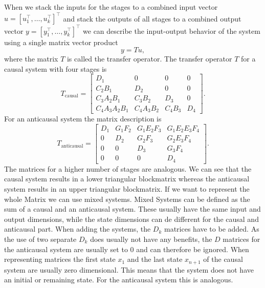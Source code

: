 \documentclass[numbers=noenddot,doctype=mastersthesis,BCOR=15mm,biblatex]{ldvbook}%
\begin{document}
When we stack the inputs for the stages to a combined input vector $u = [u_1^\top, \dots ,u_k^\top]^\top$ and stack the outputs of all stages to a combined output vector $y = [y_1^\top, \dots ,y_k^\top]^\top$ we can describe the input-output behavior of the system using a single matrix vector product 
\begin{equation}\label{eq:System_mat_vec}
	y = Tu,
\end{equation}
where the matrix $T$ is called the transfer operator.
The transfer operator $T$ for a causal system with four stages is
\begin{equation}\label{eq:T_causal}
T_\text{causal}=
\begin{bmatrix}D_{1} & 0 & 0 & 0\\C_{2} B_{1} & D_{2} & 0 & 0\\
C_{3} A_{2} B_{1} & C_{3} B_{2} & D_{3} & 0\\
C_{4} A_{3} A_{2} B_{1} & C_{4} A_{3} B_{2} & C_{4} B_{3} & D_{4}\end{bmatrix}
.
\end{equation}
For an anticausal system the matrix description is 
\begin{equation}
T_{\text{anticausal}}=
\begin{bmatrix}D_{1} & G_{1} F_{2} & G_{1} E_{2} F_{3} & G_{1} E_{2} E_{3} F_{4}\\
0 & D_{2} & G_{2} F_{3} & G_{2} E_{3} F_{4}\\
0 & 0 & D_{3} & G_{3} F_{4}\\
0 & 0 & 0 & D_{4}\end{bmatrix}.
\end{equation}
The matrices for a higher number of stages are analogous.
We can see that the causal system results in a lower triangular blockmatrix whereas the anticausal system results in an upper triangular blockmatrix.
If we want to represent the whole Matrix we can use mixed systems.
Mixed Systems can be defined as the sum of a causal and an anticausal system.
These usually have the same input and output dimensions, while the state dimensions can de different for the causal and anticausal part.
When adding the systems,  the $D_k$ matrices have to be added.
As the use of two separate $D_k$ does usually not have any benefits, the $D$ matrices for the anticausal system are usually set to 0 and can therefore be ignored.
When representing matrices the first state $x_1$ and the last state $x_{n+1}$ of the causal system are usually zero dimensional.
This means that the system does not have an initial or remaining state.
For the anticausal system this is analogous.
\end{document}
